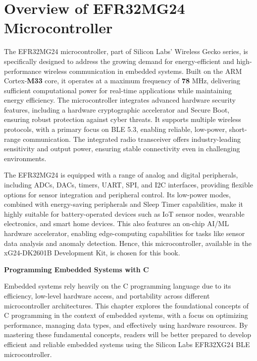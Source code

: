\documentclass[
  9pt,
  letterpaper,
  abstract,
  titlepage]{scrbook}
\makeatletter
\renewcommand\chapter{\clearpage\global\@topnum\z@
\@afterindentfalse \secdef\@chapter\@schapter}
\newif\if@firstnumbered%
\newif\if@firstunnumbered%
\newcounter{lastRomanPage}
\let\old@chapter\chapter%
\renewcommand{\chapter}{%
  \@ifstar{\unnumbered@chapter}{\numbered@chapter}%
}
\newcommand{\numbered@chapter}[1]{%
  \if@firstnumbered%
    \cleardoublepage%
    \setcounter{lastRomanPage}{\value{page}}%
    \pagenumbering{arabic}%
    \@firstnumberedfalse%
  \else
    \setcounter{page}{\value{page}}%
  \fi
  \old@chapter{#1}%
}
\newcommand{\unnumbered@chapter}[1]{%
  \if@firstunnumbered%
    \clearpage
    \setcounter{lastRomanPage}{\value{page}}%
    \pagenumbering{roman}%
    \@firstunnumberedfalse%
  \fi
  \old@chapter*{#1}%
}
\makeatother
\begin{document}
\section{Overview of EFR32MG24
Microcontroller}\label{overview-of-efr32mg24-microcontroller}

The EFR32MG24 microcontroller, part of Silicon Labs' Wireless Gecko
series, is specifically designed to address the growing demand for
energy-efficient and high-performance wireless communication in embedded
systems. Built on the ARM Cortex-\textbf{M33} core, it operates at a
maximum frequency of \textbf{78} MHz, delivering sufficient
computational power for real-time applications while maintaining energy
efficiency. The microcontroller integrates advanced hardware security
features, including a hardware cryptographic accelerator and Secure
Boot, ensuring robust protection against cyber threats. It supports
multiple wireless protocols, with a primary focus on BLE 5.3, enabling
reliable, low-power, short-range communication. The integrated radio
transceiver offers industry-leading sensitivity and output power,
ensuring stable connectivity even in challenging environments.

The EFR32MG24 is equipped with a range of analog and digital
peripherals, including ADCs, DACs, timers, UART, SPI, and I2C
interfaces, providing flexible options for sensor integration and
peripheral control. Its low-power modes, combined with energy-saving
peripherals and Sleep Timer capabilities, make it highly suitable for
battery-operated devices such as IoT sensor nodes, wearable electronics,
and smart home devices. This also features an on-chip AI/ML hardware
accelerator, enabling edge-computing capabilities for tasks like sensor
data analysis and anomaly detection. Hence, this microcontroller,
available in the xG24-DK2601B Development Kit, is chosen for this book.

\chapter{\texorpdfstring{\textbf{Programming Embedded Systems with
C}}{Programming Embedded Systems with C}}\label{programming-embedded-systems-with-c}

Embedded systems rely heavily on the C programming language due to its
efficiency, low-level hardware access, and portability across different
microcontroller architectures. This chapter explores the foundational
concepts of C programming in the context of embedded systems, with a
focus on optimizing performance, managing data types, and effectively
using hardware resources. By mastering these fundamental concepts,
readers will be better prepared to develop efficient and reliable
embedded systems using the Silicon Labs EFR32XG24 BLE microcontroller.
\end{document}
